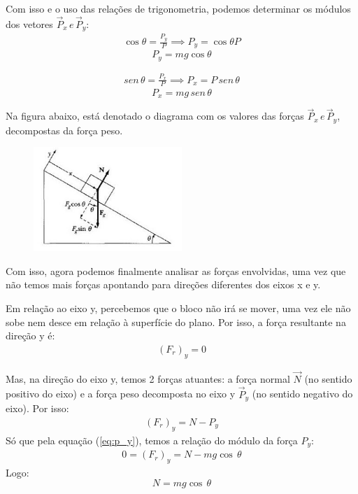 \documentclass[12pt]{extarticle}
\newcommand{\<}{\langle}
\renewcommand{\>}{\rangle}
\theoremstyle{definition}
\begin{document}
Com isso e o uso das relações de trigonometria, podemos determinar os módulos dos vetores $\vec{P}_x\, e \, \vec{P}_y$:
\begin{align*}
    \cos\theta = \frac{P_y}{P} \implies P_y =\cos\theta P
\end{align*}
\begin{equation}\label{eq:p_y}
    P_y = mg\cos\theta
\end{equation}

\begin{align*}
    sen\,\theta = \frac{P_x}{P} \implies P_x = P\,sen\,\theta
\end{align*}
\begin{equation}\label{eq:p_x}
    P_x = mg\,sen\,\theta
\end{equation}

Na figura abaixo, está denotado o diagrama com os valores das forças $\vec{P}_x\, e \, \vec{P}_y$, decompostas da força peso.
\begin{figure}[H]
    \centering
    \includegraphics[width=0.5\textwidth]{imagem01.JPG}
    \label{fig:decompose_2}
\end{figure}

Com isso, agora podemos finalmente analisar as forças envolvidas, uma vez que não temos mais forças apontando para direções diferentes dos eixos x e y.

Em relação ao eixo y, percebemos que o bloco não irá se mover, uma vez ele não sobe nem desce em relação à superfície do plano. Por isso, a força resultante na direção y é:
\begin{align*}
    (F_r)_y =0
\end{align*}

Mas, na direção do eixo y, temos 2 forças atuantes: a força normal $\vec{N}$ (no sentido positivo do eixo) e a força peso decomposta no eixo y $\vec{P}_y$ (no sentido negativo do eixo). Por isso:
\begin{align*}
    (F_r)_y = N - P_y
\end{align*}
Só que pela equação (\ref{eq:p_y}), temos a relação do módulo da força $P_y$:
\begin{align*}
    0=(F_r)_y = N - mg\cos\,\theta
\end{align*}
Logo:
\begin{equation}
    N = mg\cos\,\theta
\end{equation}
\end{document}
